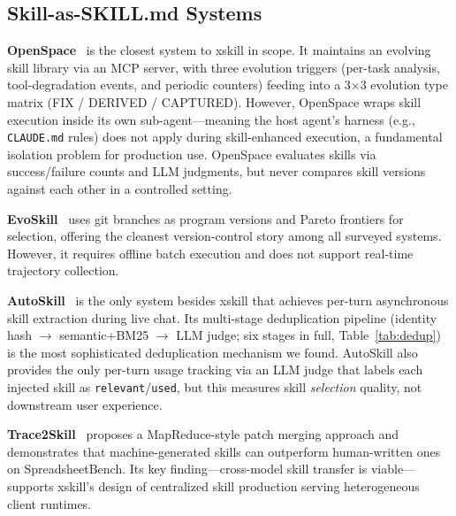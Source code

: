 \documentclass{article}
\begin{document}
\subsection{Skill-as-SKILL.md Systems}

\textbf{OpenSpace}~\citep{hku2025openspace} is the closest system to xskill in scope. It maintains an evolving skill library via an MCP server, with three evolution triggers (per-task analysis, tool-degradation events, and periodic counters) feeding into a 3$\times$3 evolution type matrix (FIX / DERIVED / CAPTURED). However, OpenSpace wraps skill execution inside its own sub-agent---meaning the host agent's harness (e.g., \texttt{CLAUDE.md} rules) does not apply during skill-enhanced execution, a fundamental isolation problem for production use. OpenSpace evaluates skills via success/failure counts and LLM judgments, but never compares skill versions against each other in a controlled setting.

\textbf{EvoSkill}~\citep{sentient2025evoskill} uses git branches as program versions and Pareto frontiers for selection, offering the cleanest version-control story among all surveyed systems. However, it requires offline batch execution and does not support real-time trajectory collection.

\textbf{AutoSkill}~\citep{ecnu2025autoskill} is the only system besides xskill that achieves per-turn asynchronous skill extraction during live chat. Its multi-stage deduplication pipeline (identity hash $\to$ semantic$+$BM25 $\to$ LLM judge; six stages in full, Table~\ref{tab:dedup}) is the most sophisticated deduplication mechanism we found. AutoSkill also provides the only per-turn usage tracking via an LLM judge that labels each injected skill as \texttt{relevant}/\texttt{used}, but this measures skill \emph{selection} quality, not downstream user experience.

\textbf{Trace2Skill}~\citep{alibaba2025trace2skill} proposes a MapReduce-style patch merging approach and demonstrates that machine-generated skills can outperform human-written ones on SpreadsheetBench. Its key finding---cross-model skill transfer is viable---supports xskill's design of centralized skill production serving heterogeneous client runtimes.
\end{document}
